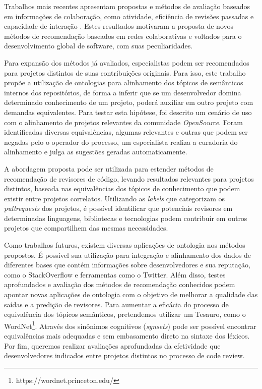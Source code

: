 \documentclass[peerreview]{acmart}
\begin{document}
Trabalhos mais recentes apresentam propostas e métodos de avaliação baseados em informações de colaboração, como atividade, eficiência de revisões passadas e capacidade de interação \cite{xia2017, fu2017, yang2016}. Estes resultados motivaram a proposta de novos métodos de recomendação baseados em redes colaborativas e voltados para o desenvolvimento global de software, com suas peculiaridades.

Para expansão dos métodos já avaliados, especialistas podem ser recomendados para projetos distintos de suas contribuições originais. Para isso, este trabalho propõe a utilização de ontologias para alinhamento dos tópicos de semânticos internos dos repositórios, de forma a inferir que se um desenvolvedor domina determinado conhecimento de um projeto, poderá auxiliar em outro projeto com demandas equivalentes. Para testar esta hipótese, foi descrito um cenário de uso com o alinhamento de projetos relevantes da comunidade \textit{OpenSource}. Foram identificadas diversas equivalências, algumas relevantes e outras que podem ser negadas pelo o operador do processo, um especialista realiza a curadoria do alinhamento e julga as sugestões geradas automaticamente.

A abordagem proposta pode ser utilizada para estender métodos de recomendação de revisores de código, levando resultados relevantes para projetos distintos, baseada nas equivalências dos tópicos de conhecimento que podem existir entre projetos correlatos. Utilizando as \textit{labels} que categorizam os \textit{pullrequests} dos projetos, é possível identificar que potenciais revisores em determinadas linguagens, bibliotecas e tecnologias podem contribuir em outros projetos que compartilhem das mesmas necessidades.

Como trabalhos futuros, existem diversas aplicações de ontologia nos métodos propostos. É possível sua utilização para integração e alinhamento dos dados de diferentes bases que contém informações sobre desenvolvedores e sua reputação, como o StackOverflow e ferramentas como o Twitter. Além disso, testes aprofundados e avaliação dos métodos de recomendação conhecidos podem apontar novas aplicações de ontologia com o objetivo de melhorar a qualidade das saídas e a predição de revisores. Para aumentar a eficácia do processo de equivalência dos tópicos semânticos, pretendemos utilizar um Tesauro, como o WordNet\footnote{https://wordnet.princeton.edu/}. Através dos sinônimos cognitivos (\textit{synsets}) pode ser possível encontrar equivalências mais adequadas e sem embasamento direto na sintaxe dos léxicos. Por fim, queremos realizar avaliações aprofundadas da efetividade que desenvolvedores indicados entre projetos distintos no processo de code review.



\end{document}
